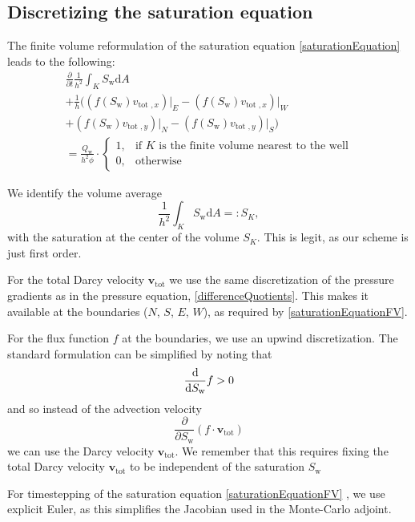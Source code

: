 \documentclass[conference]{IEEEtran}
\renewcommand*{\d}[1]{\ensuremath{\mathrm{d}#1}}
\newcommand*{\diff}[2]{\ensuremath{\frac{\d}{\d{#2}}{#1}}}
\newcommand*{\pdiff}[2]{\ensuremath{\frac{\partial}{\partial{#2}}{#1}}}
\renewcommand*{\vec}[1]{\ensuremath{{\bm{#1}}}}
\begin{document}
\subsection{Discretizing the saturation equation}
\label{discSaturationEquation}
The finite volume reformulation of the saturation equation \eqref{saturationEquation} leads to the following:
\begin{multline}
\label{saturationEquationFV}
\pdiff{\frac{1}{h^2} \int_K S_\text{w} \d{A}}{t} \\+ \frac{1}{h}\biggr((f(S_\text{w})v_{\text{tot }, x})\lvert_E - (f(S_\text{w})v_{\text{tot }, x})\lvert_W \\+ (f(S_\text{w})v_{\text{tot }, y})\lvert_N - (f(S_\text{w})v_{\text{tot }, y})\lvert_S\biggr) \\=
\frac{Q_\text{w}}{h^2 \phi} \cdot \begin{cases} 1, &\text{if } K \text{ is the finite volume nearest to the well} \\0, &\text{otherwise}\end{cases}
\end{multline}

We identify the volume average
\begin{equation}
\frac{1}{h^2} \int_K S_\text{w} \d{A} =: S_K,
\end{equation}
with the saturation at the center of the volume $S_K$. This is legit, as our scheme is just first order.

For the total Darcy velocity $\vec{v}_\text{tot}$ we use the same discretization of the pressure gradients as in the pressure equation, \eqref{differenceQuotients}.
This makes it available at the boundaries ($N$, $S$, $E$, $W$), as required by \eqref{saturationEquationFV}.

For the flux function $f$ at the boundaries, we use an upwind discretization. The standard formulation can be simplified by noting that \begin{equation}
\diff{f}{S_\text{w}} > 0
\end{equation}
and so instead of the advection velocity
\begin{equation}
\pdiff{(f \cdot \vec{v}_\text{tot})}{S_\text{w}}
\end{equation}
we can use the Darcy velocity $\vec{v}_\text{tot}.$
We remember that this requires fixing the total Darcy velocity $\vec{v}_\text{tot}$ to be independent of the saturation $S_\text{w}$

For timestepping of the saturation equation \eqref{saturationEquationFV} , we use explicit Euler, as this simplifies the Jacobian used in the Monte-Carlo adjoint.
\end{document}
